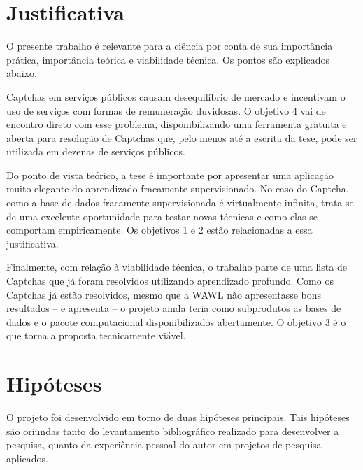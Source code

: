 \documentclass[12pt,twoside,brazilian]{book}
\begin{document}
\hypertarget{justificativa}{%
\section{Justificativa}\label{justificativa}}

O presente trabalho é relevante para a ciência por conta de sua
importância prática, importância teórica e viabilidade técnica. Os
pontos são explicados abaixo.

Captchas em serviços públicos causam desequilíbrio de mercado e
incentivam o uso de serviços com formas de remuneração duvidosas. O
objetivo 4 vai de encontro direto com esse problema, disponibilizando
uma ferramenta gratuita e aberta para resolução de Captchas que, pelo
menos até a escrita da tese, pode ser utilizada em dezenas de serviços
públicos.

Do ponto de vista teórico, a tese é importante por apresentar uma
aplicação muito elegante do aprendizado fracamente supervisionado. No
caso do Captcha, como a base de dados fracamente supervisionada é
virtualmente infinita, trata-se de uma excelente oportunidade para
testar novas técnicas e como elas se comportam empiricamente. Os
objetivos 1 e 2 estão relacionadas a essa justificativa.

Finalmente, com relação à viabilidade técnica, o trabalho parte de uma
lista de Captchas que já foram resolvidos utilizando aprendizado
profundo. Como os Captchas já estão resolvidos, mesmo que a WAWL não
apresentasse bons resultados -- e apresenta -- o projeto ainda teria
como subprodutos as bases de dados e o pacote computacional
disponibilizados abertamente. O objetivo 3 é o que torna a proposta
tecnicamente viável.

\hypertarget{hipuxf3teses}{%
\section{Hipóteses}\label{hipuxf3teses}}

O projeto foi desenvolvido em torno de duas hipóteses principais. Tais
hipóteses são oriundas tanto do levantamento bibliográfico realizado
para desenvolver a pesquisa, quanto da experiência pessoal do autor em
projetos de pesquisa aplicados.
\end{document}
